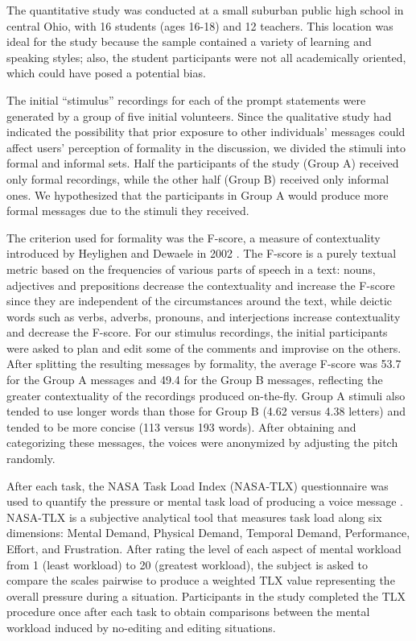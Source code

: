 The quantitative study was conducted at a small suburban public high school in central Ohio, with 16 students (ages 16-18) and 12 teachers.
This location was ideal for the study because the sample contained a variety of learning and speaking styles; also, the student participants were not all academically oriented, which could have posed a potential bias.

The initial ``stimulus'' recordings for each of the prompt statements were generated by a group of five initial volunteers. 
Since the qualitative study had indicated the possibility that prior exposure to other individuals' messages could affect users' perception of formality in the discussion, we divided the stimuli into formal and informal sets. 
Half the participants of the study (Group A) received only formal recordings, while the other half (Group B) received only informal ones.
We hypothesized that the participants in Group A would produce more formal messages due to the stimuli they received.

The criterion used for formality was the F-score, a measure of contextuality introduced by Heylighen and Dewaele in 2002 \cite{heylighen}.
The F-score is a purely textual metric based on the frequencies of various parts of speech in a text: nouns, adjectives and prepositions decrease the contextuality and increase the F-score since they are independent of the circumstances around the text, while deictic words such as verbs, adverbs, pronouns, and interjections increase contextuality and decrease the F-score. 
For our stimulus recordings, the initial participants were asked to plan and edit some of the comments and improvise on the others.
After splitting the resulting messages by formality, the average F-score was 53.7 for the Group A messages and 49.4 for the Group B messages, reflecting the greater contextuality of the recordings produced on-the-fly.
Group A stimuli also tended to use longer words than those for Group B (4.62 versus 4.38 letters) and tended to be more concise (113 versus 193 words).
After obtaining and categorizing these messages, the voices were anonymized by adjusting the pitch randomly.

After each task, the NASA Task Load Index (NASA-TLX) questionnaire was used to quantify the pressure or mental task load of producing a voice message \cite{nasatlx}. 
NASA-TLX is a subjective analytical tool that measures task load along six dimensions: Mental Demand, Physical Demand, Temporal Demand, Performance, Effort, and Frustration. 
After rating the level of each aspect of mental workload from 1 (least workload) to 20 (greatest workload), the subject is asked to compare the scales pairwise to produce a weighted TLX value representing the overall pressure during a situation. 
Participants in the study completed the TLX procedure once after each task to obtain comparisons between the mental workload induced by no-editing and editing situations.

